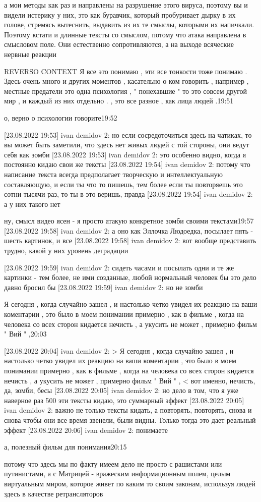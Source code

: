 а мои методы как раз и направлены на разрушение этого вируса, поэтому вы и
видели истерику у них, это как буравчик, который пробуривает дырку в их голове,
стремясь вытеснить, выдавить из их те смыслы, которыми их напичкали. Поэтому
кстати и длинные тексты со смыслом, потому что атака направлена в смысловом
поле. Они естественно сопротивляются, а на выходе всяческие нервные реакции

REVERSO CONTEXT
Я все это понимаю , эти все тонкости тоже понимаю . Здесь очень много и других
моментов , касательно о ком говорить , например , местные предатели это одна
психология , " понехавшие " то это совсем другой мир , и каждый из них отдельно
. , это все разное , как лица людей .19:51

о, верно о психологии говорите19:52

[23.08.2022 19:53] ivan demidov 2: но если сосредоточиться здесь на чатиках, то вы может быть заметили, что здесь нет живых людей с той стороны, они ведут себя как зомби
[23.08.2022 19:53] ivan demidov 2: это особенно видно, когда я постоянно кидаю свои же тексты
[23.08.2022 19:54] ivan demidov 2: потому что написание текста всегда предполагает творческую и интеллектуальную составляющую, и если ты что то пишешь, тем более если ты повторяешь это сотни тысячи раз, то ты в это веришь, правда
[23.08.2022 19:54] ivan demidov 2: а у них такого нет

ну, смысл видео ясен - я просто атакую конкретное зомби своими текстами19:57
[23.08.2022 19:58] ivan demidov 2: а оно как Эллочка Людоедка, посылает пять - шесть картинок, и все
[23.08.2022 19:58] ivan demidov 2: вот вообще представить трудно, какой у них уровень деградации

[23.08.2022 19:59] ivan demidov 2: сидеть часами и посылать одни и те же картинки - тем более, не ими созданные, любой нормальный человек бы это дело давно бросил бы
[23.08.2022 19:59] ivan demidov 2: но не зомби

Я сегодня , когда случайно зашел , и настолько четко увидел их реакцию на ваши
коментарии , это было в моем понимании примерно , как в фильме , когда на
человека со всех сторон кидается нечисть , а укусить не может , примерно фильм
" Вий " ,20:03

[23.08.2022 20:04] ivan demidov 2: 
> Я сегодня , когда случайно зашел , и настолько четко увидел их реакцию на ваши коментарии , это было в моем понимании примерно , как в фильме , когда на человека со всех сторон кидается нечисть , а укусить не может , примерно фильм " Вий " , <
вот именно, нечисть, да, зомби, бесы
[23.08.2022 20:05] ivan demidov 2: но дело в том, что я уже наверное раз 500 эти тексты кидаю, это суммарный эффект
[23.08.2022 20:05] ivan demidov 2: важно не только тексты кидать, а повторять, повторять, снова и снова чтобы они все время звенели, были видны. Только тогда это дает реальный эффект
[23.08.2022 20:06] ivan demidov 2: понимаете

а, полезный фильм для понимания20:15

потому что здесь мы по факту имеем дело не просто с рашистами или путинистами,
а с Матрицей - вражеским информационным полем, целым виртуальным миром, которое
живет по каким то своим законам, используя людей здесь в качестве
ретрансляторов
